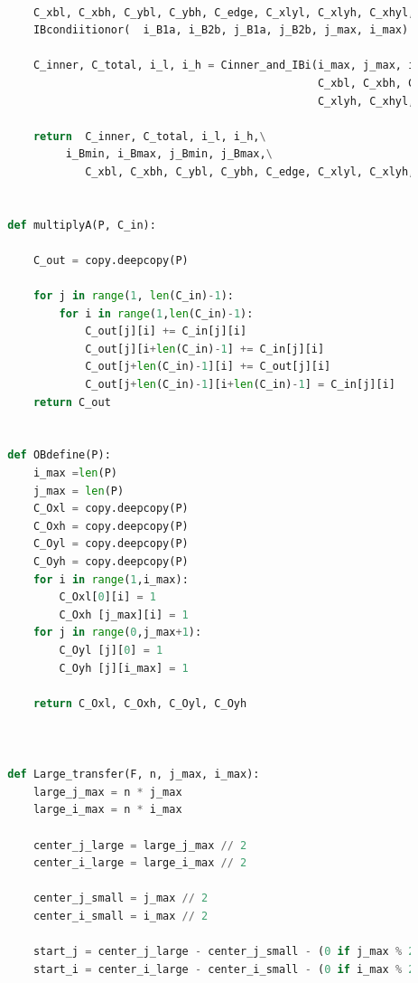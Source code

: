 \documentclass[12pt]{article}
\begin{document}
\begin{scriptsize}
\begin{lstlisting}[language=python,caption={Python code-Potential Flow}]
        
            C_xbl, C_xbh, C_ybl, C_ybh, C_edge, C_xlyl, C_xlyh, C_xhyl, C_xhyh = \ 
            IBcondiitionor(  i_B1a, i_B2b, j_B1a, j_B2b, j_max, i_max)
        
            C_inner, C_total, i_l, i_h = Cinner_and_IBi(i_max, j_max, i_Bmin, i_Bmax, j_Bmin, j_Bmax, \
                                                        C_xbl, C_xbh, C_ybl, C_ybh, C_edge, C_xlyl,\ 
                                                        C_xlyh, C_xhyl, C_xhyh)    
        
            return  C_inner, C_total, i_l, i_h,\
                 i_Bmin, i_Bmax, j_Bmin, j_Bmax,\
                    C_xbl, C_xbh, C_ybl, C_ybh, C_edge, C_xlyl, C_xlyh, C_xhyl, C_xhyh \
                    
        
        def multiplyA(P, C_in):
        
            C_out = copy.deepcopy(P)
        
            for j in range(1, len(C_in)-1):
                for i in range(1,len(C_in)-1):
                    C_out[j][i] += C_in[j][i]
                    C_out[j][i+len(C_in)-1] += C_in[j][i]
                    C_out[j+len(C_in)-1][i] += C_out[j][i]
                    C_out[j+len(C_in)-1][i+len(C_in)-1] = C_in[j][i]
            return C_out
        
        
        def OBdefine(P):
            i_max =len(P)
            j_max = len(P)
            C_Oxl = copy.deepcopy(P)
            C_Oxh = copy.deepcopy(P)
            C_Oyl = copy.deepcopy(P)
            C_Oyh = copy.deepcopy(P)
            for i in range(1,i_max):
                C_Oxl[0][i] = 1
                C_Oxh [j_max][i] = 1
            for j in range(0,j_max+1):
                C_Oyl [j][0] = 1
                C_Oyh [j][i_max] = 1
        
            return C_Oxl, C_Oxh, C_Oyl, C_Oyh
        
        
        
        def Large_transfer(F, n, j_max, i_max):
            large_j_max = n * j_max
            large_i_max = n * i_max
        
            center_j_large = large_j_max // 2
            center_i_large = large_i_max // 2
            
            center_j_small = j_max // 2
            center_i_small = i_max // 2
        
            start_j = center_j_large - center_j_small - (0 if j_max % 2 else 1)
            start_i = center_i_large - center_i_small - (0 if i_max % 2 else 1)
        

\end{lstlisting}
\end{scriptsize}
\end{document}
